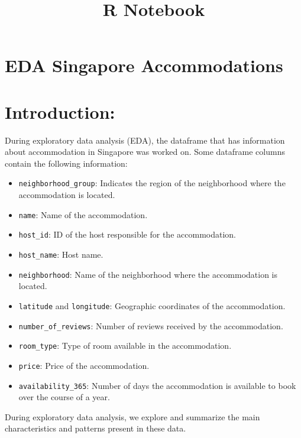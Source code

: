 \documentclass[
]{article}
\title{R Notebook}
\author{}
\date{\vspace{-2.5em}}
\providecommand{\tightlist}{%
  \setlength{\itemsep}{0pt}\setlength{\parskip}{0pt}}
\begin{document}
\maketitle

\hypertarget{eda-singapore-accommodations}{%
\section{EDA Singapore
Accommodations}\label{eda-singapore-accommodations}}

\hypertarget{introduction}{%
\section{Introduction:}\label{introduction}}

During exploratory data analysis (EDA), the dataframe that has
information about accommodation in Singapore was worked on. Some
dataframe columns contain the following information:

\begin{itemize}
\tightlist
\item
  \texttt{neighborhood\_group}: Indicates the region of the neighborhood
  where the accommodation is located.
\item
  \texttt{name}: Name of the accommodation.
\item
  \texttt{host\_id}: ID of the host responsible for the accommodation.
\item
  \texttt{host\_name}: Host name.
\item
  \texttt{neighborhood}: Name of the neighborhood where the
  accommodation is located.
\item
  \texttt{latitude} and \texttt{longitude}: Geographic coordinates of
  the accommodation.
\item
  \texttt{number\_of\_reviews}: Number of reviews received by the
  accommodation.
\item
  \texttt{room\_type}: Type of room available in the accommodation.
\item
  \texttt{price}: Price of the accommodation.
\item
  \texttt{availability\_365}: Number of days the accommodation is
  available to book over the course of a year.
\end{itemize}

During exploratory data analysis, we explore and summarize the main
characteristics and patterns present in these data.
\end{document}
